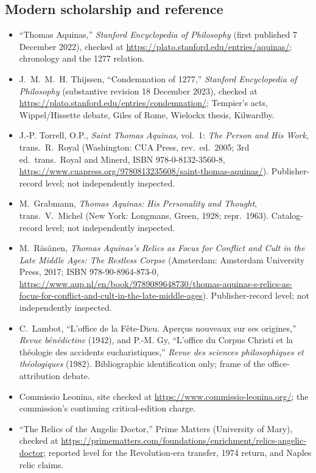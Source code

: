 \subsection*{Modern scholarship and reference}

\begin{itemize}
\item ``Thomas Aquinas,'' \textit{Stanford Encyclopedia of Philosophy}
(first published 7 December 2022), checked at
\url{https://plato.stanford.edu/entries/aquinas/}; chronology and the
1277 relation.
\item J.~M.~M.~H. Thijssen, ``Condemnation of 1277,'' \textit{Stanford
Encyclopedia of Philosophy} (substantive revision 18 December 2023),
checked at \url{https://plato.stanford.edu/entries/condemnation/};
Tempier's acts, Wippel/Hissette debate, Giles of Rome, Wielockx thesis,
Kilwardby.
\item J.-P. Torrell, O.P., \textit{Saint Thomas Aquinas}, vol.~1:
\textit{The Person and His Work}, trans.\ R.~Royal (Washington: CUA
Press, rev.\ ed.\ 2005; 3rd ed.\ trans.\ Royal and Minerd, ISBN
978-0-8132-3560-8, \url{https://www.cuapress.org/9780813235608/saint-thomas-aquinas/}).
Publisher-record level; not independently inspected.
\item M.~Grabmann, \textit{Thomas Aquinas: His Personality and Thought},
trans.\ V.~Michel (New York: Longmans, Green, 1928; repr.\ 1963).
Catalog-record level; not independently inspected.
\item M.~R\"as\"anen, \textit{Thomas Aquinas's Relics as Focus for
Conflict and Cult in the Late Middle Ages: The Restless Corpse}
(Amsterdam: Amsterdam University Press, 2017; ISBN 978-90-8964-873-0,
\url{https://www.aup.nl/en/book/9789089648730/thomas-aquinas-s-relics-as-focus-for-conflict-and-cult-in-the-late-middle-ages}).
Publisher-record level; not independently inspected.
\item C.~Lambot, ``L'office de la F\^ete-Dieu. Aper\c{c}us nouveaux sur
ses origines,'' \textit{Revue b\'en\'edictine} (1942), and P.-M. Gy,
``L'office du Corpus Christi et la th\'eologie des accidents
eucharistiques,'' \textit{Revue des sciences philosophiques et
th\'eologiques} (1982). Bibliographic identification only; frame of the
office-attribution debate.
\item Commissio Leonina, site checked at
\url{https://www.commissio-leonina.org/}; the commission's continuing
critical-edition charge.
\item ``The Relics of the Angelic Doctor,'' Prime Matters (University of
Mary), checked at
\url{https://primematters.com/foundations/enrichment/relics-angelic-doctor};
reported level for the Revolution-era transfer, 1974 return, and Naples
relic claims.
\end{itemize}

